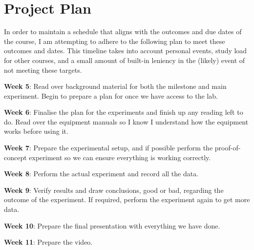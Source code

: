 \documentclass{article}
\begin{document}
\section{Project Plan}
In order to maintain a schedule that aligns with the outcomes and due dates of the course, I am attempting to adhere to the following plan to meet these outcomes and dates. This timeline takes into account personal events, study load for other courses, and a small amount of built-in leniency in the (likely) event of not meeting these targets.

\textbf{Week 5}: Read over background material for both the milestone and main experiment. Begin to prepare a plan for once we have access to the lab.

\textbf{Week 6}: Finalise the plan for the experiments and finish up any reading left to do. Read over the equipment manuals so I know I understand how the equipment works before using it.

\textbf{Week 7}: Prepare the experimental setup, and if possible perform the proof-of-concept experiment so we can ensure everything is working correctly.

\textbf{Week 8}: Perform the actual experiment and record all the data.

\textbf{Week 9}: Verify results and draw conclusions, good or bad, regarding the outcome of the experiment. If required, perform the experiment again to get more data.

\textbf{Week 10}: Prepare the final presentation with everything we have done.

\textbf{Week 11}: Prepare the video.

\printbibliography
\end{document}
